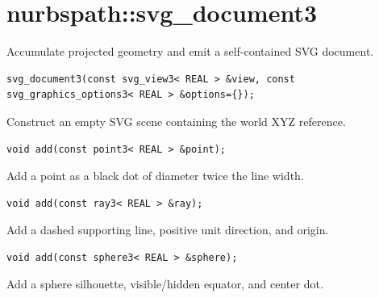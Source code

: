\section{nurbspath::svg\_document3}
Accumulate projected geometry and emit a self-contained SVG document.
\par\noindent\begin{minipage}{\linewidth}
\begin{lstlisting}[style=apireference]
svg_document3(const svg_view3< REAL > &view, const svg_graphics_options3< REAL > &options={});
\end{lstlisting}
{\footnotesize Construct an empty SVG scene containing the world XYZ reference.\par}
\end{minipage}\par\vspace{1pt}
\par\noindent\begin{minipage}{\linewidth}
\begin{lstlisting}[style=apireference]
void add(const point3< REAL > &point);
\end{lstlisting}
{\footnotesize Add a point as a black dot of diameter twice the line width.\par}
\end{minipage}\par\vspace{1pt}
\par\noindent\begin{minipage}{\linewidth}
\begin{lstlisting}[style=apireference]
void add(const ray3< REAL > &ray);
\end{lstlisting}
{\footnotesize Add a dashed supporting line, positive unit direction, and origin.\par}
\end{minipage}\par\vspace{1pt}
\par\noindent\begin{minipage}{\linewidth}
\begin{lstlisting}[style=apireference]
void add(const sphere3< REAL > &sphere);
\end{lstlisting}
{\footnotesize Add a sphere silhouette, visible/hidden equator, and center dot.\par}
\end{minipage}\par\vspace{1pt}

